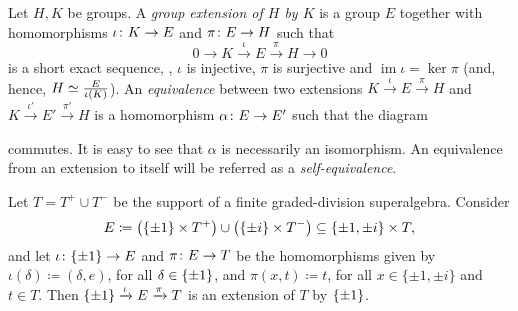 \begin{defi}
	Let $H, K$ be groups.
	A \emph{group extension of $H$ by $K$} is a group $E$ together with homomorphisms $\iota\colon K \to E$ and $\pi\colon E \to H$ such that
	\begin{equation}\label{eq:short-exact-sequence}
		0 \rightarrow K \xrightarrow{\iota} E \xrightarrow{\pi} H \rightarrow 0
	\end{equation}
	is a short exact sequence, \ie,
	$\iota$ is injective, $\pi$ is surjective and $\operatorname{im} \iota = \ker \pi$ (and, hence, $H \simeq \frac{E}{\iota(K)}$).
	An \emph{equivalence} between two extensions $K \xrightarrow{\iota} E \xrightarrow{\pi} H$ and $K \xrightarrow{\iota'} E' \xrightarrow{\pi'} H$ is a homomorphism $\alpha\colon E \to E'$ such that the diagram
	\begin{center}
	\end{center}
	commutes.
	It is easy to see that $\alpha$ is necessarily an isomorphism.
	An equivalence from an extension to itself will be referred as a \emph{self-equivalence}.
\end{defi}

\begin{ex}\label{ex:main-extension}
    Let $T = T^+ \cup T^-$ be the support of a finite graded-division superalgebra.  Consider 
    \[
        E \coloneqq \big(\{ \pm 1 \} \times T^+\big) \cup \big(\{\pm i\} \times T^-\big) \subseteq \{ \pm 1, \pm i \} \times T,
    \] 
    and let $\iota\colon \{ \pm 1 \} \to E$ and $\pi\colon E \to T$ be the homomorphisms given by $\iota(\delta) \coloneqq (\delta, e)$, for all $\delta \in \{ \pm 1 \}$,  and $\pi (x, t) \coloneqq t$, for all $x \in \{ \pm 1, \pm i \}$ and $t\in T$.
	Then $\{ \pm 1 \} \xrightarrow{\iota} E \xrightarrow{\pi} T$ is an extension of $T$ by $\{ \pm 1 \}$.
\end{ex}

